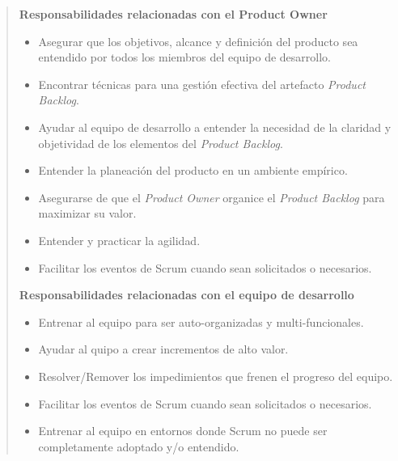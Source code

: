     \begin{quote}
        {\bf Responsabilidades relacionadas con el Product Owner }
        \begin{itemize}
        \item Asegurar que los objetivos, alcance y definición del producto sea
              entendido por todos los miembros del equipo de desarrollo.

        \item Encontrar técnicas para una gestión efectiva del artefacto
              {\it Product Backlog}.

        \item Ayudar al equipo de desarrollo a entender la necesidad de la claridad
              y objetividad de los elementos del {\it Product Backlog}.

        \item Entender la planeación del producto en un ambiente empírico.

        \item Asegurarse de que el {\it Product Owner} organice el {\it Product
              Backlog} para maximizar su valor.

        \item Entender y practicar la agilidad.

        \item Facilitar los eventos de Scrum cuando sean solicitados o necesarios.\\
        \end{itemize}

        {\bf Responsabilidades relacionadas con el equipo de desarrollo}
        \begin{itemize}
        \item Entrenar al equipo para ser auto-organizadas y multi-funcionales.
        \item Ayudar al quipo a crear incrementos de alto valor.
        \item Resolver/Remover los impedimientos que frenen el progreso del equipo.
        \item Facilitar los eventos de Scrum cuando sean solicitados o necesarios.
        \item Entrenar al equipo en entornos donde Scrum no puede ser completamente
                adoptado y/o entendido.\\
        \end{itemize}

    \end{quote}

